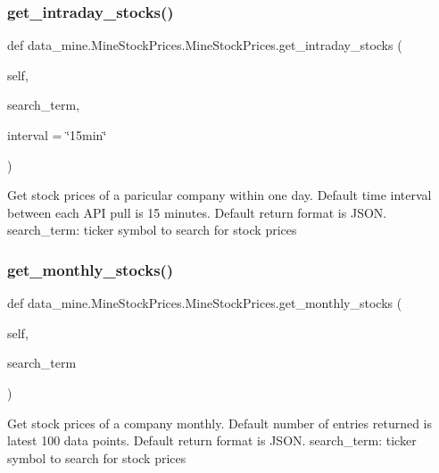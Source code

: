 \subsubsection{\texorpdfstring{get\+\_\+intraday\+\_\+stocks()}{get\_intraday\_stocks()}}
{\footnotesize\ttfamily def data\+\_\+mine.\+Mine\+Stock\+Prices.\+Mine\+Stock\+Prices.\+get\+\_\+intraday\+\_\+stocks (\begin{DoxyParamCaption}\item[{}]{self,  }\item[{}]{search\+\_\+term,  }\item[{}]{interval = {\ttfamily \char`\"{}15min\char`\"{}} }\end{DoxyParamCaption})}

\begin{DoxyVerb}    Get stock prices of a paricular company within one day.
    Default time interval between each API pull is 15 minutes.
    Default return format is JSON.
    search_term: ticker symbol to search for stock prices
\end{DoxyVerb}
 \mbox{\label{classdata__mine_1_1_mine_stock_prices_1_1_mine_stock_prices_a4e1c7514206e1ea659893e630a3e3ce7}} 
\subsubsection{\texorpdfstring{get\+\_\+monthly\+\_\+stocks()}{get\_monthly\_stocks()}}
{\footnotesize\ttfamily def data\+\_\+mine.\+Mine\+Stock\+Prices.\+Mine\+Stock\+Prices.\+get\+\_\+monthly\+\_\+stocks (\begin{DoxyParamCaption}\item[{}]{self,  }\item[{}]{search\+\_\+term }\end{DoxyParamCaption})}

\begin{DoxyVerb}    Get stock prices of a company monthly.
    Default number of entries returned is latest 100 data points.
    Default return format is JSON.
    search_term: ticker symbol to search for stock prices
\end{DoxyVerb}
 \mbox{\label{classdata__mine_1_1_mine_stock_prices_1_1_mine_stock_prices_a079e6738aef24fb09b5c23a1b97e97f4}} 
